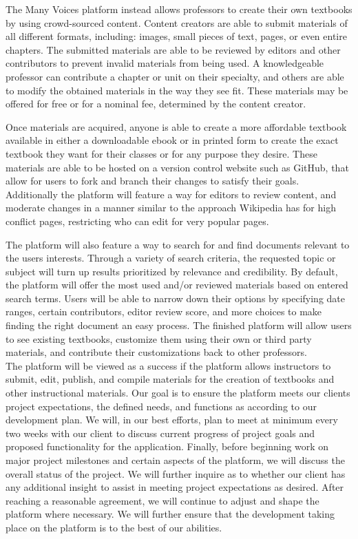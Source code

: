 \documentclass[letterpaper, 10pt, draftclsnofoot, onecolumn]{IEEEtran}
\begin{document}
 The Many Voices platform instead allows professors to create their own textbooks 
by using crowd-sourced content. Content creators are able to submit materials of 
all different formats, including: images, small pieces of text, pages, or even entire chapters. 
The submitted materials are able to be reviewed by editors and other contributors to prevent invalid 
materials from being used.
A knowledgeable professor can contribute a chapter or unit on their specialty, and 
others are able to modify the obtained materials in the way they see fit. These materials may be
offered for free or for a nominal fee, determined by the content creator.

Once materials are acquired, anyone is able to create a more affordable textbook available in either
a downloadable ebook or in printed form to create the exact textbook they want for their classes
or for any purpose they desire. These materials are able to be hosted on a version control 
website such as GitHub, that allow for users to fork and branch their changes to satisfy their goals.
Additionally the platform will feature a way for editors to review content, and moderate changes in a manner similar
to the approach Wikipedia has for high conflict pages, restricting who can edit for very popular pages.

The platform will also feature a way to search for and find documents relevant to the users interests. 
Through a variety of search criteria, the requested topic or subject will turn up results prioritized by
relevance and credibility. By default, the platform will offer the most used and/or reviewed materials
based on entered search terms. Users will be able to narrow down their options by specifying date ranges,
certain contributors, editor review score, and more choices to make finding the right document an easy process.
The finished platform will allow users to see existing 
textbooks, customize them using their own or third party materials, and contribute their 
customizations back to other professors. \\

The platform will be viewed as a success if the platform allows instructors to submit, edit, publish, 
and compile materials for the creation of textbooks and other instructional materials. 
Our goal is to ensure the platform meets our clients project expectations, the defined needs,
and functions as according to our development plan. We will, in our best efforts, plan to meet at 
minimum every two weeks with our client to discuss current progress of project goals and 
proposed functionality for the application. 
Finally, before beginning work on major project milestones and certain aspects of the platform, we will 
discuss the overall status of the project. We will further inquire as to whether our client has any additional insight to assist in 
meeting project expectations as desired. After reaching a reasonable agreement, we will continue to adjust 
and shape the platform where necessary. We will further ensure that the development taking place on
the platform is to the best of our abilities. \\
\end{document}
